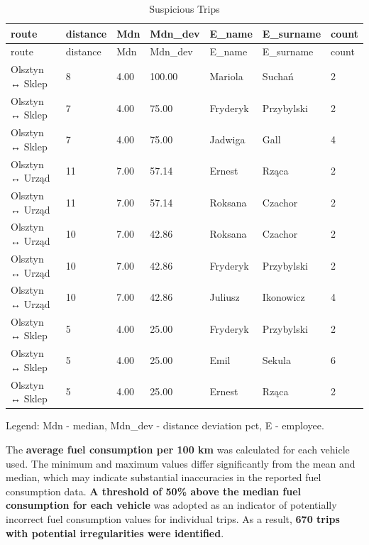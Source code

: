 \documentclass[
  letterpaper,
  DIV=11,
  numbers=noendperiod]{scrartcl}
\begin{document}
\begin{longtable}[]{@{}lllllll@{}}
\caption{Suspicious Trips}\label{T_40626}\tabularnewline
\toprule\noalign{}
route & distance & Mdn & Mdn\_dev & E\_name & E\_surname & count \\
\midrule\noalign{}
\endfirsthead
\toprule\noalign{}
route & distance & Mdn & Mdn\_dev & E\_name & E\_surname & count \\
\midrule\noalign{}
\endhead
\bottomrule\noalign{}
\endlastfoot
Olsztyn ↔ Sklep & 8 & 4.00 & 100.00 & Mariola & Suchań & 2 \\
Olsztyn ↔ Sklep & 7 & 4.00 & 75.00 & Fryderyk & Przybylski & 2 \\
Olsztyn ↔ Sklep & 7 & 4.00 & 75.00 & Jadwiga & Gall & 4 \\
Olsztyn ↔ Urząd & 11 & 7.00 & 57.14 & Ernest & Rząca & 2 \\
Olsztyn ↔ Urząd & 11 & 7.00 & 57.14 & Roksana & Czachor & 2 \\
Olsztyn ↔ Urząd & 10 & 7.00 & 42.86 & Roksana & Czachor & 2 \\
Olsztyn ↔ Urząd & 10 & 7.00 & 42.86 & Fryderyk & Przybylski & 2 \\
Olsztyn ↔ Urząd & 10 & 7.00 & 42.86 & Juliusz & Ikonowicz & 4 \\
Olsztyn ↔ Sklep & 5 & 4.00 & 25.00 & Fryderyk & Przybylski & 2 \\
Olsztyn ↔ Sklep & 5 & 4.00 & 25.00 & Emil & Sekula & 6 \\
Olsztyn ↔ Sklep & 5 & 4.00 & 25.00 & Ernest & Rząca & 2 \\
\end{longtable}

\scriptsize Legend: Mdn - median, Mdn\_dev - distance deviation pct, E -
employee.\\

\vspace{0.5cm}
\normalsize

The \textbf{average fuel consumption per 100 km} was calculated for each
vehicle used. The minimum and maximum values differ significantly from
the mean and median, which may indicate substantial inaccuracies in the
reported fuel consumption data. \textbf{A threshold of 50\% above the
median fuel consumption for each vehicle} was adopted as an indicator of
potentially incorrect fuel consumption values for individual trips. As a
result, \textbf{670 trips with potential irregularities were
identified}.
\end{document}
